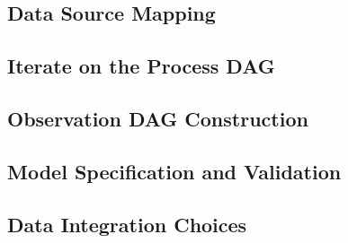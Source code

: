 \documentclass{article}
\begin{document}
\subsection{Data Source Mapping}

\subsection{Iterate on the Process DAG}


\subsection{Observation DAG Construction}

\subsection{Model Specification and Validation}\label{sec:spec-validate}

\subsection{Data Integration Choices}

\end{document}
